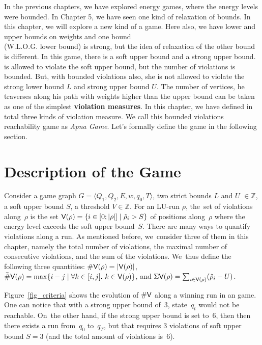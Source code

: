  In the previous chapters, we have explored energy games, where the energy levels were bounded. In Chapter 5, we have seen one kind of relaxation of bounds. In this chapter, we will explore a new kind of a game. Here also, we have lower and upper bounds on weights and one bound\\(W.L.O.G. lower bound) is strong, but the idea of relaxation of the other bound is different. In this game, there is a soft upper bound and a strong upper bound.  is allowed to violate the soft upper bound, but the number of violations is bounded. But, with bounded violations also, she is not allowed to violate the strong lower bound $L$ and strong upper bound $U$. The number of vertices, he traverses along his path with weights higher than the upper bound can be taken as one of the simplest \textbf{violation measures}. In this chapter, we have defined in total three kinds of violation measure. We call this bounded violations reachability game as \textit{Apna Game}. Let's formally define the game in the following section.\\

\section{Description of the Game}
Consider a game graph $G=\langle Q_1, Q_2, E, w, q_0, T \rangle$, two strict bounds $L$ and $U$ $\in \mathbb{Z}$, a soft upper bound $S$, a threshold $V \in \mathbb{Z}$. For an LU-run $\rho$, the~set of violations along~$\rho$ is the set $\textsf{V}(\rho) = \{i \in [0;|\rho|]\mid \tilde\rho_i>S\}$ of positions
along~$\rho$ where the energy level exceeds the soft upper bound~$S$.
There are many ways to quantify violations along
a run. As mentioned before, we~consider three of them in this chapter, namely the total number of violations, the maximal number of consecutive violations, and the sum of the violations. We~thus define the following three quantities:
$\#\textsf{V}(\rho) = |\textsf{V}(\rho)|$,   $\bar\#\textsf{V}(\rho)  = \max\{i-j \mid \forall k\in[i,j].\ k\in \textsf{V}(\rho)\}$, and $\Sigma\textsf{V}(\rho) = \sum_{i \in \textsf{V}(\rho)} (\tilde\rho_i-U)$.


Figure~\ref{fig_criteria} shows the evolution of $\#\textsf{V}$ along a
winning run in an \LVenergynb game.
One can notice that with a strong upper bound of~$3$, state~$q_t$ would not be reachable. On~the other hand, if the strong upper bound is set to~$6$, then then
there exists a run from~$q_0$ to~$q_T$, but that requires $3$
violations of soft upper bound $S=3$ (and the total amount of
violations is~$6$).


